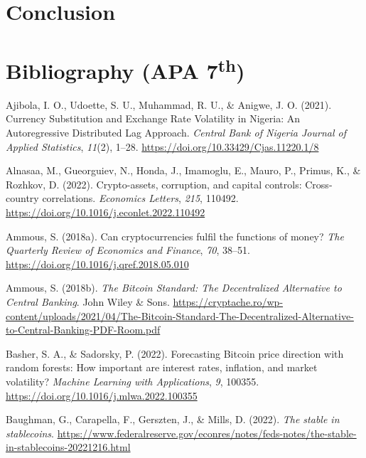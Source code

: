 \documentclass[
]{article}
\newlength{\cslhangindent}
\newenvironment{CSLReferences}[2] %
 {\begin{list}{}{%
  \setlength{\itemindent}{0pt}
  \setlength{\leftmargin}{0pt}
  \setlength{\parsep}{0pt}
  \ifodd #1
   \setlength{\leftmargin}{\cslhangindent}
   \setlength{\itemindent}{-1\cslhangindent}
  \fi
  \setlength{\itemsep}{#2\baselineskip}}}
 {\end{list}}
\begin{document}
\newpage

\section{Conclusion}\label{conclusion}

\newpage

\section{\texorpdfstring{Bibliography (APA 7\textsuperscript{th})}{Bibliography (APA 7)}}\label{bibliography-apa-7}

\label{refs}
\begin{CSLReferences}{1}{0}
Ajibola, I. O., Udoette, S. U., Muhammad, R. U., \& Anigwe, J. O. (2021). Currency Substitution and Exchange Rate Volatility in Nigeria: An Autoregressive Distributed Lag Approach. \emph{Central Bank of Nigeria Journal of Applied Statistics}, \emph{11}(2), 1--28. \url{https://doi.org/10.33429/Cjas.11220.1/8}

Alnasaa, M., Gueorguiev, N., Honda, J., Imamoglu, E., Mauro, P., Primus, K., \& Rozhkov, D. (2022). Crypto-assets, corruption, and capital controls: Cross-country correlations. \emph{Economics Letters}, \emph{215}, 110492. \url{https://doi.org/10.1016/j.econlet.2022.110492}

Ammous, S. (2018a). Can cryptocurrencies fulfil the functions of money? \emph{The Quarterly Review of Economics and Finance}, \emph{70}, 38--51. \url{https://doi.org/10.1016/j.qref.2018.05.010}

Ammous, S. (2018b). \emph{The Bitcoin Standard: The Decentralized Alternative to Central Banking}. John Wiley \& Sons. \url{https://cryptache.ro/wp-content/uploads/2021/04/The-Bitcoin-Standard-The-Decentralized-Alternative-to-Central-Banking-PDF-Room.pdf}

Basher, S. A., \& Sadorsky, P. (2022). Forecasting Bitcoin price direction with random forests: How important are interest rates, inflation, and market volatility? \emph{Machine Learning with Applications}, \emph{9}, 100355. \url{https://doi.org/10.1016/j.mlwa.2022.100355}

Baughman, G., Carapella, F., Gerszten, J., \& Mills, D. (2022). \emph{The stable in stablecoins}. \url{https://www.federalreserve.gov/econres/notes/feds-notes/the-stable-in-stablecoins-20221216.html}


\end{CSLReferences}
\end{document}

